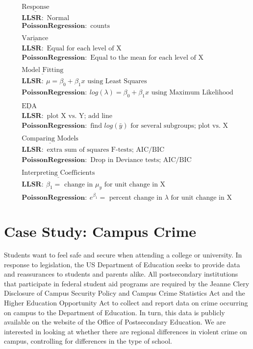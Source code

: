 \documentclass[
]{krantz}
\begin{document}
\begin{gather*}
\underline{\textrm{Response}} \\
\mathbf{LLSR:}\textrm{ Normal} \\
\mathbf{Poisson Regression:}\textrm{ counts} \\
\textrm{ } \\
\underline{\textrm{Variance}} \\
\mathbf{LLSR:}\textrm{ Equal for each level of X} \\
\mathbf{Poisson Regression:}\textrm{ Equal to the mean for each level of X} \\
\textrm{ } \\
\underline{\textrm{Model Fitting}} \\
\mathbf{LLSR:}\ \mu=\beta_0+\beta_1x \textrm{ using Least Squares}\\
\mathbf{Poisson Regression:}\ log(\lambda)=\beta_0+\beta_1x \textrm{ using Maximum Likelihood}\\
\textrm{ } \\
\underline{\textrm{EDA}} \\
\mathbf{LLSR:}\textrm{ plot X vs. Y; add line} \\
\mathbf{Poisson Regression:}\textrm{ find }log(\bar{y})\textrm{ for several subgroups; plot vs. X} \\
\textrm{ } \\
\underline{\textrm{Comparing Models}} \\
\mathbf{LLSR:}\textrm{ extra sum of squares F-tests; AIC/BIC} \\
\mathbf{Poisson Regression:}\textrm{ Drop in Deviance tests; AIC/BIC} \\
\textrm{ } \\
\underline{\textrm{Interpreting Coefficients}} \\
\mathbf{LLSR:}\ \beta_1=\textrm{ change in }\mu_y\textrm{ for unit change in X} \\
\mathbf{Poisson Regression:}\ e^{\beta_1}=\textrm{ percent change in }\lambda\textrm{ for unit change in X} 
\end{gather*}

\hypertarget{case-study-campus-crime}{%
\section{Case Study: Campus Crime}\label{case-study-campus-crime}}

Students want to feel safe and secure when attending a college or university. In response to legislation, the US Department of Education seeks to provide data and reassurances to students and parents alike. All postsecondary institutions that participate in federal student aid programs are required by the Jeanne Clery Disclosure of Campus Security Policy and Campus Crime Statistics Act and the Higher Education Opportunity Act to collect and report data on crime occurring on campus to the Department of Education. In turn, this data is publicly available on the website of the Office of Postsecondary Education. We are interested in looking at whether there are regional differences in violent crime on campus, controlling for differences in the type of school.
\end{document}
